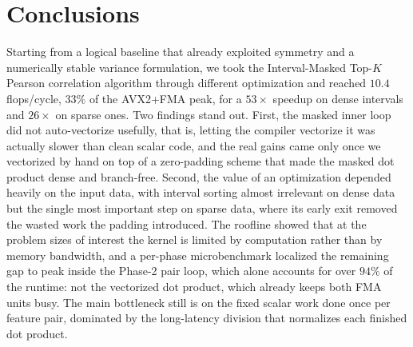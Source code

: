 \documentclass[letterpaper]{article}
\newcommand{\mypar}[1]{{\bf #1.}}
\begin{document}
\section{Conclusions}
Starting from a logical baseline that already exploited symmetry and a numerically stable variance formulation, we took the Interval-Masked Top-$K$ Pearson correlation algorithm through different optimization and reached $10.4$ flops/cycle, $33\%$ of the AVX2+FMA peak, for a $53\times$ speedup on dense intervals and $26\times$ on sparse ones. Two findings stand out. First, the masked inner loop did not auto-vectorize usefully, that is, letting the compiler vectorize it was actually slower than clean scalar code, and the real gains came only once we vectorized by hand on top of a zero-padding scheme that made the masked dot product dense and branch-free. Second, the value of an optimization depended heavily on the input data, with interval sorting almost irrelevant on dense data but the single most important step on sparse data, where its early exit removed the wasted work the padding introduced. The roofline showed that at the problem sizes of interest the kernel is limited by computation rather than by memory bandwidth, and a per-phase microbenchmark localized the remaining gap to peak inside the Phase-2 pair loop, which alone accounts for over $94\%$ of the runtime: not the vectorized dot product, which already keeps both FMA units busy. The main bottleneck still is on the fixed scalar work done once per feature pair, dominated by the long-latency division that normalizes each finished dot product.






\end{document}
